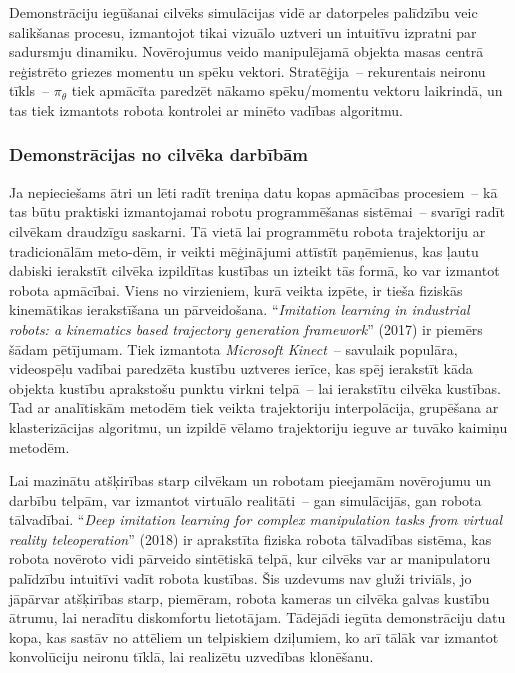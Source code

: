 \documentclass[12pt, a4paper]{article}
\numberwithin{equation}{section} %
\begin{document}
Demonstrāciju iegūšanai cilvēks simulācijas vidē ar datorpeles palīdzību veic salikšanas procesu, izmantojot tikai vizuālo uztveri un intuitīvu izpratni par sadursmju dinamiku. Novērojumus veido manipulējamā objekta masas centrā reģistrēto griezes momentu un spēku vektori. Stratēģija~-- rekurentais neironu tīkls~-- $\pi_{\theta}$ tiek apmācīta paredzēt nākamo spēku/momentu vektoru laikrindā, un tas tiek izmantots robota kontrolei ar minēto vadības algoritmu.

\subsubsection{Demonstrācijas no cilvēka darbībām}

Ja nepieciešams ātri un lēti radīt treniņa datu kopas apmācības procesiem~-- kā tas  būtu praktiski izmantojamai robotu programmēšanas sistēmai~-- svarīgi radīt cilvēkam draudzīgu saskarni. Tā vietā lai programmētu robota trajektoriju ar tradicionālām meto-dēm, ir veikti mēģinājumi attīstīt paņēmienus, kas ļautu dabiski ierakstīt cilvēka izpildītas kustības un izteikt tās formā, ko var izmantot robota apmācībai. Viens no virzieniem, kurā veikta izpēte, ir tieša fiziskās kinemātikas ierakstīšana un pārveidošana. ``\textit{Imitation learning in industrial robots: a kinematics based trajectory generation framework}'' \cite{jha2017imitation} (2017) ir piemērs šādam pētījumam. Tiek izmantota \textit{Microsoft Kinect}~-- savulaik populāra, videospēļu vadībai paredzēta kustību uztveres ierīce, kas spēj ierakstīt kāda objekta kustību aprakstošu punktu virkni telpā~-- lai ierakstītu cilvēka kustības. Tad ar analītiskām metodēm tiek veikta trajektoriju interpolācija, grupēšana ar klasterizācijas algoritmu, un izpildē vēlamo trajektoriju ieguve ar tuvāko kaimiņu metodēm.

Lai mazinātu atšķirības starp cilvēkam un robotam pieejamām novērojumu un darbību telpām, var izmantot virtuālo realitāti~-- gan simulācijās, gan robota tālvadībai. ``\textit{Deep imitation learning for complex manipulation tasks from virtual reality teleoperation}'' \cite{zhang2018deep} (2018) ir aprakstīta fiziska robota tālvadības sistēma, kas robota novēroto vidi pārveido sintētiskā telpā, kur cilvēks var ar manipulatoru palīdzību intuitīvi vadīt robota kustības. Šis uzdevums nav gluži triviāls, jo jāpārvar atšķirības starp, piemēram, robota kameras un cilvēka galvas kustību ātrumu, lai neradītu diskomfortu lietotājam. Tādējādi iegūta demonstrāciju datu kopa, kas sastāv no attēliem un telpiskiem dziļumiem, ko arī tālāk var izmantot konvolūciju neironu tīklā, lai realizētu uzvedības klonēšanu.
\end{document}
